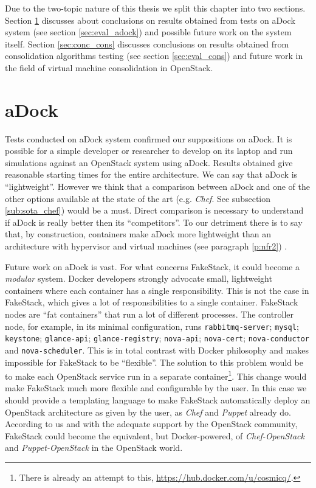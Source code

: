 
Due to the two-topic nature of this thesis we split this chapter into two sections. Section \ref{sec:conc_adock} discusses about conclusions on results obtained from tests on aDock system (see section \ref{sec:eval_adock}) and possible future work on the system itself. Section \ref{sec:conc_cons} discusses conclusions on results obtained from consolidation algorithms testing (see section \ref{sec:eval_cons}) and future work in the field of virtual machine consolidation in OpenStack.

\section{aDock}
\label{sec:conc_adock}
Tests conducted on aDock system confirmed our suppositions on aDock. It is possible for a simple developer or researcher to develop on its laptop and run simulations against an OpenStack system using aDock. Results obtained give reasonable starting times for the entire architecture. We can say that aDock is ``lightweight''. However we think that a comparison between aDock and one of the other options available at the state of the art (e.g. \textit{Chef}. See subsection \ref{sub:sota_chef}) would be a must. Direct comparison is necessary to understand if aDock is really better then its ``competitors''. To our detriment there is to say that, by construction, containers make aDock more lightweight than an architecture with hypervisor and virtual machines (see paragraph \ref{p:nfr2}) .

Future work on aDock is vast. For what concerns FakeStack, it could become a \emph{modular} system. Docker developers strongly advocate small, lightweight containers where each container has a single responsibility. This is not the case in FakeStack, which gives a lot of responsibilities to a single container. FakeStack nodes are ``fat containers'' that run a lot of different processes. The controller node, for example, in its minimal configuration, runs \texttt{rabbitmq-server}; \texttt{mysql}; \texttt{keystone}; \texttt{glance-api}; \texttt{glance-registry}; \texttt{nova-api}; \texttt{nova-cert}; \texttt{nova-conductor} and \texttt{nova-scheduler}. This is in total contrast with Docker philosophy and makes impossible for FakeStack to be ``flexible''. The solution to this problem would be to make each OpenStack service run in a separate container\footnote{There is already an attempt to this, \url{https://hub.docker.com/u/cosmicq/}.}. This change would make FakeStack much more flexible and configurable by the user. In this case we should provide a templating language to make FakeStack automatically deploy an OpenStack architecture as given by the user, as \textit{Chef} and \textit{Puppet} already do. According to us and with the adequate support by the OpenStack community, FakeStack could become the equivalent, but Docker-powered, of \textit{Chef-OpenStack} and \textit{Puppet-OpenStack} in the OpenStack world.

